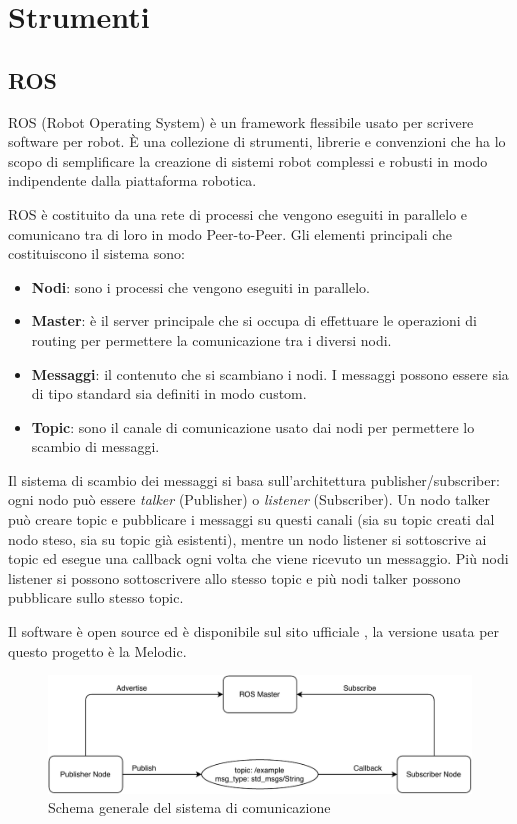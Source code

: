 \chapter{Strumenti}

\section{ROS}

ROS (Robot Operating System) è un framework flessibile usato per scrivere software per robot.
È una collezione di strumenti, librerie e convenzioni che ha lo scopo di semplificare la creazione di sistemi robot complessi e robusti in modo indipendente dalla piattaforma robotica.

ROS è costituito da una rete di processi che vengono eseguiti in parallelo e comunicano tra di loro in modo Peer-to-Peer.
Gli elementi principali che costituiscono il sistema sono:
\begin{itemize}
  \item \textbf{Nodi}: sono i processi che vengono eseguiti in parallelo.
  \item \textbf{Master}: è il server principale che si occupa di effettuare le operazioni di routing per permettere la comunicazione tra i diversi nodi.
  \item \textbf{Messaggi}: il contenuto che si scambiano i nodi. I messaggi possono essere sia di tipo standard sia definiti in modo custom.
  \item \textbf{Topic}: sono il canale di comunicazione usato dai nodi per permettere lo scambio di messaggi.
\end{itemize}
Il sistema di scambio dei messaggi si basa sull'architettura publisher/subscriber: ogni nodo può essere \textit{talker} (Publisher) o \textit{listener}  (Subscriber).
Un nodo talker può creare topic e pubblicare i messaggi su questi canali (sia su topic creati dal nodo steso, sia su topic già esistenti), mentre un nodo listener si sottoscrive ai topic ed esegue una callback ogni volta che viene ricevuto un messaggio. Più nodi listener si possono sottoscrivere allo stesso topic e più nodi talker possono pubblicare sullo stesso topic.

Il software è open source ed è disponibile sul sito ufficiale \cite{ROS}, la versione usata per questo progetto è la Melodic.

\begin{figure}[H]
\centering
\includegraphics[width=\textwidth]{images/ros_system.pdf}
\caption{Schema generale del sistema di comunicazione}
\end{figure}

